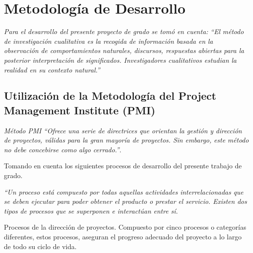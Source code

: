 \chapter{Metodología de Desarrollo}
\label{cha:Metodología de Desarrollo}

\textit{Para el desarrollo del presente proyecto de grado se tomó en cuenta: “El método de investigación cualitativa es la recogida de información basada en la observación de comportamientos naturales, discursos, respuestas abiertas para la posterior interpretación de significados. Investigadores cualitativos estudian la realidad en su contexto natural.”}

\section{Utilización de la Metodología del Project Management Institute (PMI)}
\label{sec:Utilización de la Metodología del Project Management Institute (PMI)}

\textit{Método PMI “Ofrece una serie de directrices que orientan la gestión y dirección de proyectos, válidas para la gran mayoría de proyectos. Sin embargo, este método no debe concebirse como algo cerrado.”}.

Tomando en cuenta los siguientes procesos de desarrollo del presente trabajo de grado.

\textit{“Un proceso está compuesto por todas aquellas actividades interrelacionadas que se deben ejecutar para poder obtener el producto o prestar el servicio. Existen dos tipos de procesos que se superponen e interactúan entre sí.}

Procesos de la dirección de proyectos. Compuesto por cinco procesos o categorías diferentes, estos procesos, aseguran el progreso adecuado del proyecto a lo largo de todo su ciclo de vida.

